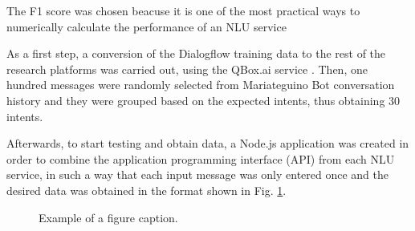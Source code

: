 \documentclass[conference]{IEEEtran}
\begin{document}
The F1 score was chosen beacuse it is one of the most practical ways to numerically calculate the performance of an NLU service

As a first step, a conversion of the Dialogflow training data to the rest of the research platforms was carried out, using the QBox.ai service \cite{qbox2020}. Then, one hundred messages were randomly selected from Mariateguino Bot conversation history and they were grouped based on the expected intents, thus obtaining 30 intents.

Afterwards, to start testing and obtain data, a Node.js application was created in order to combine the application programming interface (API) from each NLU service, in such a way that each input message was only entered once and the desired data was obtained in the format shown in Fig. \ref{fig:nludata}.

\begin{figure}[htbp]
    \centerline{}
    \caption{Example of a figure caption.}
    \label{fig:nludata}
\end{figure}
\end{document}

